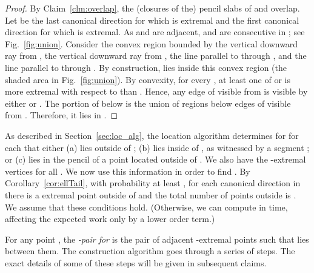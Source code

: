 \documentclass[letterpaper,11pt]{article}
\begin{document}
\begin{proof} 
By Claim~\ref{clm:overlap}, the 
(closures of the) pencil slabs 
of  and  overlap.
Let  be the last canonical 
direction for which  is extremal 
and  the first canonical direction 
for which  is extremal. As  and  
are adjacent,  and  are 
consecutive in ; see 
Fig.~\ref{fig:union}.
Consider the convex region bounded 
by the vertical downward
ray from , the vertical 
downward ray from , the line parallel
to  through , and the line 
parallel to  through 
. By construction,  lies inside 
this convex region (the shaded
area in Fig.~\ref{fig:union}). 
By convexity, for every 
, at 
least one of  
or  is more extremal with respect 
to  than . Hence,
any edge of  visible from  is 
visible by either  or .
The portion of  below 
 is the union of 
regions below edges of  visible 
from . Therefore, it 
lies in .
\end{proof}

As described in Section~\ref{sec:loc_alg},
the location algorithm determines 
for for each  that
either
(a)  lies outside of ;
(b)  lies inside of , as witnessed 
by a segment ; or
(c)  lies in the pencil of a 
point located outside of .
We also have the -extremal 
vertices  for all .
We now use this information in order to 
find . By Corollary~\ref{cor:ellTail}, with
probability at least ,
for each canonical direction in  
there is a extremal point
outside of  and the total number 
of points outside  is .
We assume that these conditions 
hold. (Otherwise, we can compute  
in  time, affecting the expected
work only by a lower order term.)

For any point , the 
\emph{-pair for } is the pair
of adjacent -extremal points 
such that  lies between them.
The construction algorithm goes through a series 
of steps. The exact details
of some of these steps will be given 
in subsequent claims.
\medskip
\end{document}
